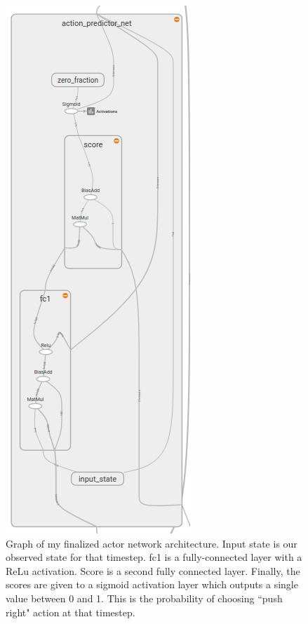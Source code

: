 \documentclass[12pt,a4paper]{article}
\begin{document}
\begin{figure}[htbp]
\begin{center}
\includegraphics[scale=0.66]{actor_net.png}
\caption{Graph of my finalized actor network architecture. Input state is our observed state for that timestep. fc1 is a fully-connected layer with a ReLu activation. Score is a second fully connected layer. Finally, the scores are given to a sigmoid activation layer which outputs a single value between 0 and 1. This is the probability of choosing ``push right" action at that timestep.}
\label{actor_net}
\end{center}
\end{figure}
\end{document}
